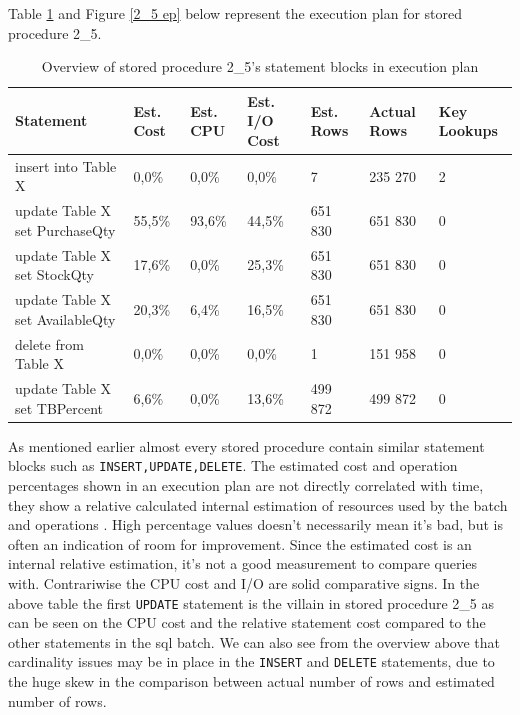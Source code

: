 \documentclass{cslthse-msc}
\begin{document}
Table \ref{2_5 overview} and Figure \ref{2_5 ep} below represent the execution plan for stored procedure 2\_5.
\begin{table}[H]
\begin{center}
\hspace*{-2cm}
\begin{tabular}{|l|l|l|l|l|l|l|}
\hline
Statement & Est. Cost & Est. CPU & Est. I/O Cost & Est. Rows & Actual Rows & Key Lookups\\\hline
insert into  Table X &	0,0\% & 0,0\% & 0,0\% & \cellcolor{red} 7 & \cellcolor{red} 235 270 & 2\\\hline 
update  Table X set PurchaseQty & 55,5\% & 93,6\% & 44,5\% & 651 830 & 651 830 & 0 \\\hline 
update  Table X set StockQty & 17,6\% & 0,0\% & 25,3\% & 651 830 & 651 830 & 0 \\\hline 
update  Table X set AvailableQty & 20,3\% & 6,4\% & 16,5\% & 651 830 & 651 830 & 0 \\\hline 
delete from  Table X & 0,0\% & 0,0\% & 0,0\% &\cellcolor{red} 1 & \cellcolor{red} 151 958& 0 \\\hline 
update  Table X set TBPercent & 6,6\% & 0,0\% & 13,6\% & 499 872 &  499 872 & 0 \\\hline 
\end{tabular}
\caption{Overview of stored procedure 2\_5's statement blocks in execution plan}
\label{2_5 overview}
\end{center}
\end{table}
\noindent As mentioned earlier almost every stored procedure contain similar statement blocks such as \texttt{INSERT,UPDATE,DELETE}. The estimated cost and operation percentages shown in an execution plan are not directly correlated with time, they show a relative calculated internal estimation of resources used by the batch and operations \cite{cost}. High percentage values doesn't necessarily mean it's bad, but is often an indication of room for improvement. Since the estimated cost is an internal relative estimation, it's not a good measurement to compare queries with. Contrariwise the CPU cost and I/O are solid comparative signs. In the above table the first \texttt{UPDATE} statement is the villain in stored procedure 2\_5 as can be seen on the CPU cost and the relative statement cost compared to the other statements in the sql batch. We can also see from the overview above that cardinality issues may be in place in the \texttt{INSERT} and \texttt{DELETE} statements, due to the huge skew in the comparison between actual number of rows and estimated number of rows.    
\end{document}
